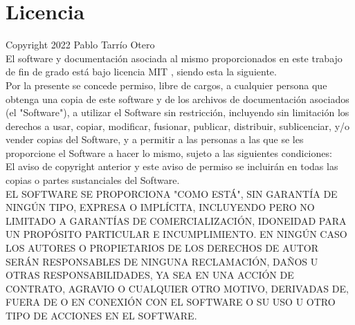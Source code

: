 \chapter{Licencia}
\setlength{\parindent}{0cm}
Copyright \textsuperscript{\textcopyright} 2022 Pablo Tarrío Otero
\\

El software y documentación asociada al mismo proporcionados en este trabajo de
fin de grado está bajo licencia MIT \cite{mit}, siendo esta la siguiente.
\\

Por la presente se concede permiso, libre de cargos, a cualquier persona que obtenga una copia de este software y de los archivos de documentación asociados (el "Software"), a utilizar el Software sin restricción, incluyendo sin limitación los derechos a usar, copiar, modificar, fusionar, publicar, distribuir, sublicenciar, y/o vender copias del Software, y a permitir a las personas a las que se les proporcione el Software a hacer lo mismo, sujeto a las siguientes condiciones:
\\

El aviso de copyright anterior y este aviso de permiso se incluirán en todas las copias o partes sustanciales del Software.
\\

EL SOFTWARE SE PROPORCIONA "COMO ESTÁ", SIN GARANTÍA DE NINGÚN TIPO, EXPRESA O IMPLÍCITA, INCLUYENDO PERO NO LIMITADO A GARANTÍAS DE COMERCIALIZACIÓN, IDONEIDAD PARA UN PROPÓSITO PARTICULAR E INCUMPLIMIENTO. EN NINGÚN CASO LOS AUTORES O PROPIETARIOS DE LOS DERECHOS DE AUTOR SERÁN RESPONSABLES DE NINGUNA RECLAMACIÓN, DAÑOS U OTRAS RESPONSABILIDADES, YA SEA EN UNA ACCIÓN DE CONTRATO, AGRAVIO O CUALQUIER OTRO MOTIVO, DERIVADAS DE, FUERA DE O EN CONEXIÓN CON EL SOFTWARE O SU USO U OTRO TIPO DE ACCIONES EN EL SOFTWARE.